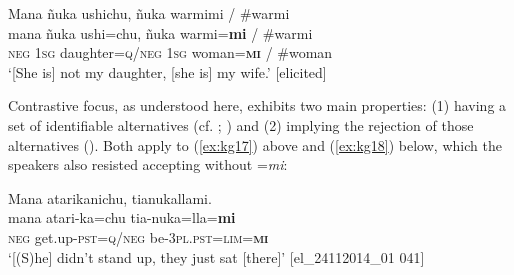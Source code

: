 \documentclass[output=paper]{langscibook}
\begin{document}
\begin{exe}
	\ex \label{ex:kg17}
	\glll Mana ñuka ushichu, ñuka warmimi / \#warmi\\
	mana ñuka ushi=chu, ñuka warmi=\textbf{mi} / \#warmi\\
	\textsc{neg}	 1\textsc{sg} daughter=\textsc{q}/\textsc{neg} 1\textsc{sg} woman=\textbf{\textsc{mi}} / \#woman\\
	\trans ‘[She is] not my daughter, [she is] my wife.’ [elicited]
\end{exe}

Contrastive focus, as understood here, exhibits two main properties: (1) having a set of identifiable alternatives (cf. \citealt{Kiss1998}; \citealt{Repp2010}) and (2) implying the rejection of those alternatives (\citealt[1336]{Repp2010}). Both apply to (\ref{ex:kg17}) above and (\ref{ex:kg18}) below, which the speakers also resisted accepting without =\textit{mi}:

 
\begin{exe}
	\ex \label{ex:kg18}
	\glll Mana atarikanichu, tianukallami.\\
	mana atari-ka=chu tia-nuka=lla=\textbf{mi}\\
	\textsc{neg} get.up-\textsc{pst}=\textsc{q}/\textsc{neg}  be-3\textsc{pl}.\textsc{pst}=\textsc{lim}=\textbf{\textsc{mi}}\\
	\trans ‘[(S)he] didn't stand up, they just sat [there]’ [el\_24112014\_01   041]
\end{exe}
\end{document}
